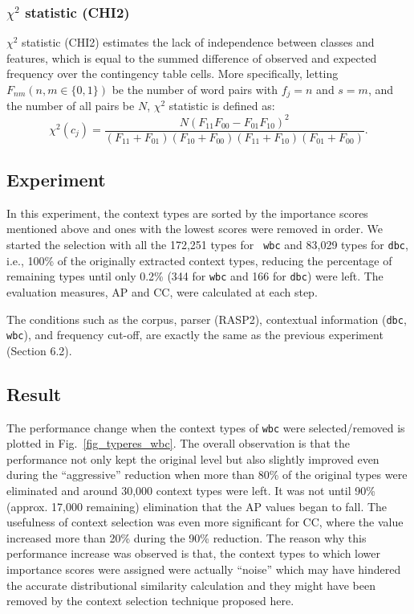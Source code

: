 \documentclass[english]{jnlp_1.4}
\begin{document}
\subsubsection{$\chi^2$ statistic (CHI2)}

$\chi^2$ statistic (CHI2) estimates the lack of independence between
classes and features, which is equal to the summed difference of
observed and expected frequency over the contingency table cells. More
specifically, letting $F_{nm} (n, m \in \{0, 1\})$ be the number of
word pairs with $f_j = n$ and $s = m$, and the number of all pairs be
$N$, $\chi^2$ statistic is defined as:
\begin{equation}
  \chi^2(c_j) = \frac{N(F_{11}F_{00} - F_{01}F_{10})^2}{(F_{11}+F_{01})(F_{10}+F_{00})(F_{11}+F_{10})(F_{01}+F_{00})}.
\end{equation}

\subsection{Experiment}

In this experiment, the context types are sorted by the importance
scores mentioned above and ones with the lowest scores were removed in
order.  
We started the selection with all the 172,251 types for {\tt
wbc} and 83,029 types for {\tt dbc}, i.e., 100\% of the originally
\pagebreak
extracted context types, reducing the percentage of remaining types
until only 0.2\% (344 for {\tt wbc} and 166 for {\tt dbc}) were left.
The evaluation measures, AP and CC, were calculated at each step.

The conditions such as the corpus, parser (RASP2), contextual
information ({\tt dbc}, {\tt wbc}), and frequency cut-off, are exactly the
same as the previous experiment (Section 6.2).

\subsection{Result}

The performance change when the context types of {\tt wbc} were
selected/removed is plotted in Fig.~\ref{fig_typeres_wbc}.  The
overall observation is that the performance not only kept the original
level but also slightly improved even during the ``aggressive''
reduction when more than 80\% of the original types were eliminated
and around 30,000 context types were left. It was not until 90\%
(approx. 17,000 remaining) elimination that the AP values began to
fall. The usefulness of context selection was even more significant
for CC, where the value increased more than 20\% during the 90\%
reduction. The reason why this performance increase was observed is
that, the context types to which lower importance scores were assigned
were actually ``noise'' which may have hindered the accurate
distributional similarity calculation and they might have been removed
by the context selection technique proposed here.
\end{document}
